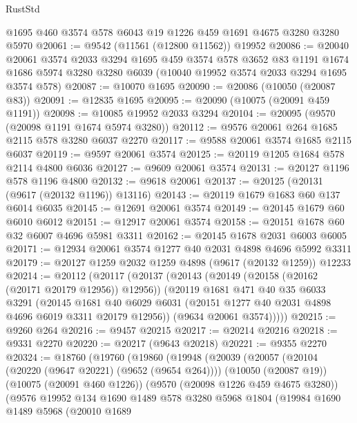 \begin{lexlean}{RustStd}
\begin{coremodule}
{\begin{coremodule}
{{{{{{{{{{{{{{{{{{{{{{{{{{{{{{{{{    @1695
    @460
    @3574
    @578
    @6043
    @19
    @1226
    @459
    @1691
    @4675
    @3280
    @3280
    @5970
@20061 := @9542 (@11561 (@12800 @11562)) @19952
@20086 := @20040
    @20061
    @3574
    @2033
    @3294
    @1695
    @459
    @3574
    @578
    @3652
    @83
    @1191
    @1674
    @1686
    @5974
    @3280
    @3280
    @6039
    (@10040 @19952 @3574 @2033 @3294 @1695 @3574 @578)
@20087 := @10070 @1695
@20090 := @20086 (@10050 (@20087 @83))
@20091 := @12835 @1695
@20095 := @20090 (@10075 (@20091 @459 @1191))
@20098 := @10085 @19952 @2033 @3294
@20104 := @20095 (@9570 (@20098 @1191 @1674 @5974 @3280))
@20112 := @9576 @20061 @264 @1685 @2115 @578 @3280 @6037 @2270
@20117 := @9588 @20061 @3574 @1685 @2115 @6037
@20119 := @9597 @20061 @3574
@20125 := @20119 @1205 @1684 @578 @2114 @4800 @6036
@20127 := @9609 @20061 @3574
@20131 := @20127 @1196 @578 @1196 @4800
@20132 := @9618 @20061
@20137 := @20125 (@20131 (@9617 (@20132 @1196)) @13116)
@20143 := @20119 @1679 @1683 @60 @137 @6014 @6035
@20145 := @12691 @20061 @3574
@20149 := @20145 @1679 @60 @6010 @6012
@20151 := @12917 @20061 @3574
@20158 := @20151 @1678 @60 @32 @6007 @4696 @5981 @3311
@20162 := @20145 @1678 @2031 @6003 @6005
@20171 := @12934 @20061 @3574 @1277 @40 @2031 @4898 @4696 @5992 @3311
@20179 := @20127 @1259 @2032 @1259 @4898 (@9617 (@20132 @1259)) @12233
@20214 := @20112
    (@20117
      (@20137
        (@20143
          (@20149 (@20158 (@20162 (@20171 @20179 @12956)) @12956))
          (@20119
            @1681
            @471
            @40
            @35
            @6033
            @3291
            (@20145
              @1681
              @40
              @6029
              @6031
              (@20151 @1277 @40 @2031 @4898 @4696 @6019 @3311 @20179 @12956))
            (@9634 @20061 @3574)))))
@20215 := @9260 @264
@20216 := @9457 @20215
@20217 := @20214 @20216
@20218 := @9331 @2270
@20220 := @20217 (@9643 @20218)
@20221 := @9355 @2270
@20324 := @18760
    (@19760
      (@19860
        (@19948
          (@20039
            (@20057
              (@20104 (@20220 (@9647 @20221) (@9652 (@9654 @264))))
              (@10050 (@20087 @19))
              (@10075 (@20091 @460 @1226))
              (@9570 (@20098 @1226 @459 @4675 @3280))
              (@9576
                @19952
                @134
                @1690
                @1489
                @578
                @3280
                @5968
                @1804
                (@19984
                  @1690
                  @1489
                  @5968
                  (@20010
                    @1689
}}}}}}}}}}}}}}}}}}}}}}}}}}}}}}}}}
\end{coremodule}}
\end{coremodule}
\end{lexlean}
